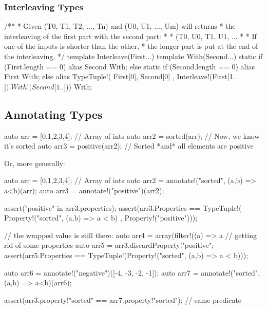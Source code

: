 \subsubsection{Interleaving Types}\label{interleavingtypes}

\begin{dcode}
/**
 * Given (T0, T1, T2, ..., Tn) and (U0, U1, ..., Um) will returns
 * the interleaving of the first part with the second part: 
 *
 * (T0, U0, T1, U1, ...
 *
 * If one of the inputs is shorter than the other, 
 * the longer part is put at the end of the interleaving.
 */
template Interleave(First...)
{
    template With(Second...)
    {
	static if (First.length == 0)
	    alias Second With;
	else static if (Second.length == 0)
	    alias First With;
	else
	    alias TypeTuple!( First[0], Second[0]
	                    , Interleave!(First[1..$]).With!(Second[1..$])) 
             With;
    }
}

\end{dcode}

\subsection{Annotating Types}\label{annotatingtypes}


\begin{dcode}
auto arr = [0,1,2,3,4]; // Array of ints
auto arr2 = sorted(arr); // Now, we know it's sorted
auto arr3 = positive(arr2); // Sorted *and* all elements are positive
\end{dcode}

Or, more generally:

\begin{dcode}
auto arr = [0,1,2,3,4]; // Array of ints
auto arr2 = annotate!("sorted", (a,b) => a<b)(arr);
auto arr3 = annotate!("positive")(arr2);

assert("positive" in arr3.properties);
assert(arr3.Properties == TypeTuple!( Property!("sorted", (a,b) => a < b)
                                    , Property!("positive")));

// the wrapped value is still there:             
auto arr4 = array(filter!((a) => a%
// getting rid of some properties
auto arr5 = arr3.discardProperty!"positive"; 
assert(arr5.Properties == TypeTuple!(Property!("sorted", (a,b) => a < b)));

auto arr6 = annotate!("negative")([-4, -3, -2, -1]);
auto arr7 = annotate!("sorted", (a,b) => a<b)(arr6);

assert(arr3.property!"sorted" == arr7.property!"sorted"); // same predicate                                    
\end{dcode}

